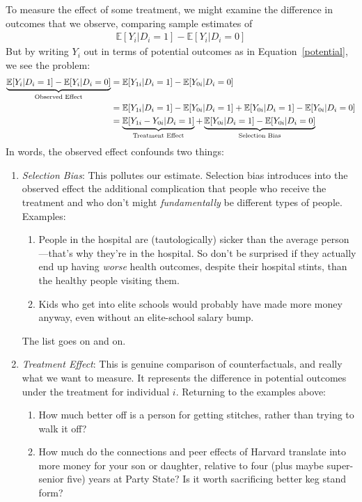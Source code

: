 \documentclass[12pt]{article}
\theoremstyle{plain}
\theoremstyle{definition}
\theoremstyle{remark}
\begin{document}
To measure the effect of some treatment, we might examine the difference
in outcomes that we observe, comparing sample estimates of
\begin{align*}
  \mathbb{E}[Y_i | D_i = 1] - \mathbb{E}[Y_i | D_i = 0]
\end{align*}
But by writing $Y_i$ out in terms of potential outcomes as in
Equation~\ref{potential}, we see the problem:
\begin{align*}
  \underbrace{\mathbb{E}[Y_i | D_i = 1]
  - \mathbb{E}[Y_i | D_i = 0]}_{\text{Observed Effect}}
  &=
  \mathbb{E}[Y_{1i} | D_i = 1]
  - \mathbb{E}[Y_{0i} | D_i = 0] \\
  &=
  \mathbb{E}[Y_{1i} | D_i = 1] - \mathbb{E}[Y_{0i} | D_i = 1]
  + \mathbb{E}[Y_{0i} | D_i = 1] - \mathbb{E}[Y_{0i} | D_i = 0] \\
  &=
  \underbrace{\mathbb{E}[Y_{1i} - Y_{0i}| D_i = 1]}_{%
    \text{Treatment Effect}}
  + \underbrace{\mathbb{E}[Y_{0i} | D_i = 1]
  - \mathbb{E}[Y_{0i} | D_i = 0]}_{\text{Selection Bias}}
\end{align*}
In words, the observed effect confounds two things:
\begin{enumerate}
  \item \emph{Selection Bias}: This pollutes our estimate. Selection
    bias introduces into the observed effect the additional complication
    that people who receive the treatment and who don't might
    \emph{fundamentally} be different types of people. Examples:
    \begin{enumerate}
      \item People in the hospital are (tautologically) sicker than the
        average person---that's why they're in the hospital. So don't be
        surprised if they actually end up having \emph{worse} health
        outcomes, despite their hospital stints, than the healthy people
        visiting them.
      \item Kids who get into elite schools would probably have made
        more money anyway, even without an elite-school salary bump.
    \end{enumerate}
    The list goes on and on.
  \item \emph{Treatment Effect}: This is genuine comparison of
    counterfactuals, and really what we want to measure. It represents
    the difference in potential outcomes under the treatment for
    individual $i$. Returning to the examples above:
    \begin{enumerate}
      \item How much better off is a person for getting stitches, rather
        than trying to walk it off?
      \item How much do the connections and peer effects of Harvard
        translate into more money for your son or daughter, relative to
        four (plus maybe super-senior five) years at Party State? Is it
        worth sacrificing better keg stand form?
    \end{enumerate}
\end{enumerate}
\end{document}
